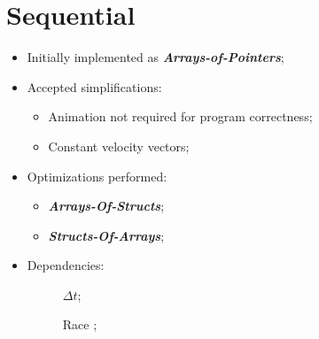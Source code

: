 \section{Sequential}

\begin{frame}
	\begin{itemize}
		\item Initially implemented as \textbf{\itshape Arrays-of-Pointers};
		\item Accepted simplifications:
		\begin{itemize}
			\item Animation not required for program correctness;
			\item Constant velocity vectors;
		\end{itemize}
		\item Optimizations performed:
		\begin{itemize}
			\item \textbf{\itshape Arrays-Of-Structs};
			\item \textbf{\itshape Structs-Of-Arrays};
		\end{itemize}
		\item Dependencies:
		\begin{description}
			\item[\computeflux] $\Delta t$;
			\item[\update\hfill] Race ;
		\end{description}
	\end{itemize}
\end{frame}
